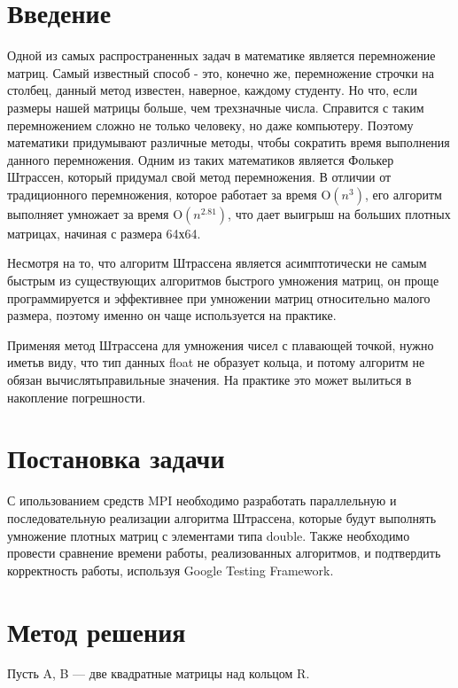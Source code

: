 \documentclass{report}
\begin{document}
\setcounter{page}{2}

\tableofcontents
\newpage

\section*{Введение}
Одной из самых распространенных задач в математике является перемножение матриц. Самый известный способ - это, конечно же, перемножение строчки на столбец, данный метод известен, наверное, каждому студенту. Но что, если размеры нашей матрицы больше, чем трехзначные числа. Справится с таким перемножением сложно не только человеку, но даже компьютеру. Поэтому математики придумывают различные методы, чтобы сократить время выполнения данного перемножения. Одним из таких математиков является Фолькер Штрассен, который придумал свой метод перемножения. В отличии от традиционного перемножения, которое работает за время O$(n^3)$, его алгоритм выполняет умножает за время O$(n^{2.81})$, что дает выигрыш на больших плотных матрицах, начиная с размера 64х64.

Несмотря на то, что алгоритм Штрассена является асимптотически не самым быстрым из существующих алгоритмов быстрого умножения матриц, он проще программируется и эффективнее при умножении матриц относительно малого размера, поэтому именно он чаще используется на практике. 

Применяя метод Штрассена для умножения чисел с плавающей точкой, нужно иметьв виду, что тип данных float не образует кольца, и потому алгоритм не обязан вычислятьправильные значения. На практике это может вылиться в накопление погрешности.
\newpage

\section*{Постановка задачи}
С ипользованием средств MPI необходимо разработать параллельную и последовательную реализации алгоритма Штрассена, которые будут выполнять умножение плотных матриц с элементами типа double. Также необходимо провести сравнение времени работы, реализованных алгоритмов, и подтвердить корректность работы, используя Google Testing Framework.
\newpage

\section*{Метод решения}
Пусть A, B — две квадратные матрицы над кольцом R. 
\end{document}
